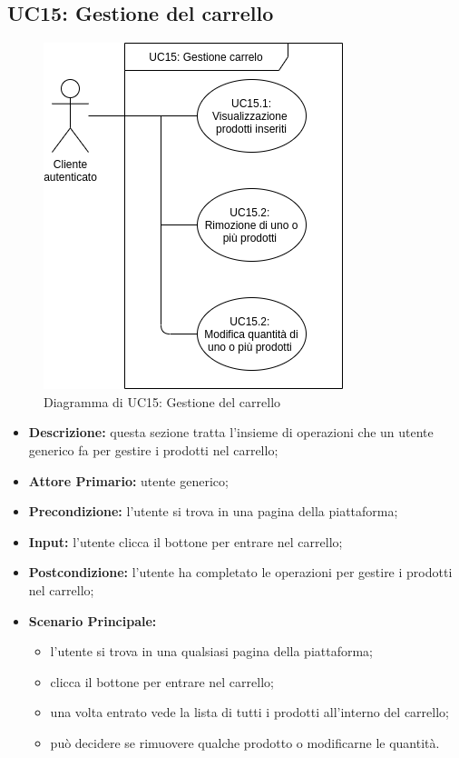         \subsection{UC15: Gestione del carrello}
        \begin{figure}[!ht]
            \caption{Diagramma di UC15: Gestione del carrello}
            \vspace{10px}
            \includegraphics[scale=0.5]{../../../Images/AnalisiRequisiti/UC15}
            \centering
        \end{figure}
        \begin{itemize}
            \item \textbf{Descrizione:} questa sezione tratta l'insieme di operazioni che un utente generico fa per gestire i prodotti nel carrello;
            \item \textbf{Attore Primario:} utente generico;
            \item \textbf{Precondizione:} l'utente si trova in una pagina della piattaforma;
            \item \textbf{Input:} l'utente clicca il bottone per entrare nel carrello;
            \item \textbf{Postcondizione:} l'utente ha completato le operazioni per gestire i prodotti nel carrello;
            \item \textbf{Scenario Principale:}
                \begin{itemize}
                    \item l'utente si trova in una qualsiasi pagina della piattaforma;
                    \item clicca il bottone per entrare nel carrello;
                    \item una volta entrato vede la lista di tutti i prodotti all'interno del carrello;
                    \item può decidere se rimuovere qualche prodotto o modificarne le quantità.
                \end{itemize}
        \end{itemize}
